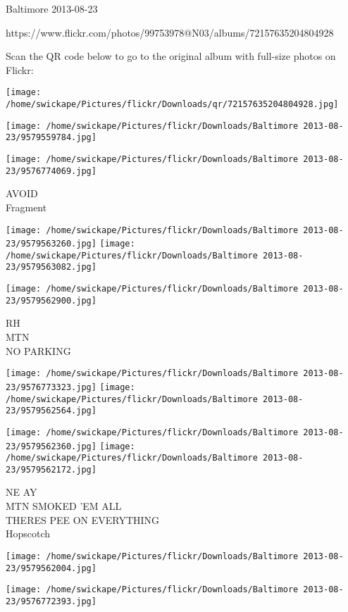 \documentclass[10pt,letterpaper]{article}
\begin{document}
Baltimore 2013-08-23

https://www.flickr.com/photos/99753978@N03/albums/72157635204804928

Scan the QR code below to go to the original album with full-size photos on Flickr:

\texttt{[image: /home/swickape/Pictures/flickr/Downloads/qr/72157635204804928.jpg]}
\pagebreak

\texttt{[image: /home/swickape/Pictures/flickr/Downloads/Baltimore 2013-08-23/9579559784.jpg]}

\vspace{0.25in}
\texttt{[image: /home/swickape/Pictures/flickr/Downloads/Baltimore 2013-08-23/9576774069.jpg]}

AVOID\\
Fragment\\
\pagebreak

\texttt{[image: /home/swickape/Pictures/flickr/Downloads/Baltimore 2013-08-23/9579563260.jpg]}
\texttt{[image: /home/swickape/Pictures/flickr/Downloads/Baltimore 2013-08-23/9579563082.jpg]}

\vspace{0.25in}
\texttt{[image: /home/swickape/Pictures/flickr/Downloads/Baltimore 2013-08-23/9579562900.jpg]}

RH\\
MTN\\
NO PARKING\\
\pagebreak

\texttt{[image: /home/swickape/Pictures/flickr/Downloads/Baltimore 2013-08-23/9576773323.jpg]}
\texttt{[image: /home/swickape/Pictures/flickr/Downloads/Baltimore 2013-08-23/9579562564.jpg]}

\texttt{[image: /home/swickape/Pictures/flickr/Downloads/Baltimore 2013-08-23/9579562360.jpg]}
\texttt{[image: /home/swickape/Pictures/flickr/Downloads/Baltimore 2013-08-23/9579562172.jpg]}

NE AY\\
MTN SMOKED 'EM ALL\\
THERES PEE ON EVERYTHING\\
Hopscotch\\
\pagebreak

\texttt{[image: /home/swickape/Pictures/flickr/Downloads/Baltimore 2013-08-23/9579562004.jpg]}

\vspace{0.25in}
\texttt{[image: /home/swickape/Pictures/flickr/Downloads/Baltimore 2013-08-23/9576772393.jpg]}
\end{document}
